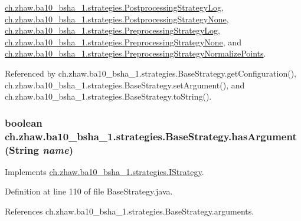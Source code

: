 \hyperlink{classch_1_1zhaw_1_1ba10__bsha__1_1_1strategies_1_1PostprocessingStrategyLog_a8ec219607a862bcff3c4290f020d4575}{ch.zhaw.ba10\_\-bsha\_\-1.strategies.PostprocessingStrategyLog}, \hyperlink{classch_1_1zhaw_1_1ba10__bsha__1_1_1strategies_1_1PostprocessingStrategyNone_a6c5447b46c9ddb6add9d5f3f21ac7721}{ch.zhaw.ba10\_\-bsha\_\-1.strategies.PostprocessingStrategyNone}, \hyperlink{classch_1_1zhaw_1_1ba10__bsha__1_1_1strategies_1_1PreprocessingStrategyLog_a278aa48e1f1dd64d130fe528d879c632}{ch.zhaw.ba10\_\-bsha\_\-1.strategies.PreprocessingStrategyLog}, \hyperlink{classch_1_1zhaw_1_1ba10__bsha__1_1_1strategies_1_1PreprocessingStrategyNone_ae9f3b294f1a1d8b53e604256cc0a796f}{ch.zhaw.ba10\_\-bsha\_\-1.strategies.PreprocessingStrategyNone}, and \hyperlink{classch_1_1zhaw_1_1ba10__bsha__1_1_1strategies_1_1PreprocessingStrategyNormalizePoints_ac9826f8ef875b62955887e6f3ffe7cff}{ch.zhaw.ba10\_\-bsha\_\-1.strategies.PreprocessingStrategyNormalizePoints}.

Referenced by ch.zhaw.ba10\_\-bsha\_\-1.strategies.BaseStrategy.getConfiguration(), ch.zhaw.ba10\_\-bsha\_\-1.strategies.BaseStrategy.setArgument(), and ch.zhaw.ba10\_\-bsha\_\-1.strategies.BaseStrategy.toString().\hypertarget{classch_1_1zhaw_1_1ba10__bsha__1_1_1strategies_1_1BaseStrategy_a468d38d65e49d18ced35a34962e3f667}{
\subsubsection[{hasArgument}]{\setlength{\rightskip}{0pt plus 5cm}boolean ch.zhaw.ba10\_\-bsha\_\-1.strategies.BaseStrategy.hasArgument (String {\em name})}}
\label{classch_1_1zhaw_1_1ba10__bsha__1_1_1strategies_1_1BaseStrategy_a468d38d65e49d18ced35a34962e3f667}


Implements \hyperlink{interfacech_1_1zhaw_1_1ba10__bsha__1_1_1strategies_1_1IStrategy_a32756f860175f58c3d01b453cdc46bc2}{ch.zhaw.ba10\_\-bsha\_\-1.strategies.IStrategy}.

Definition at line 110 of file BaseStrategy.java.

References ch.zhaw.ba10\_\-bsha\_\-1.strategies.BaseStrategy.arguments.


